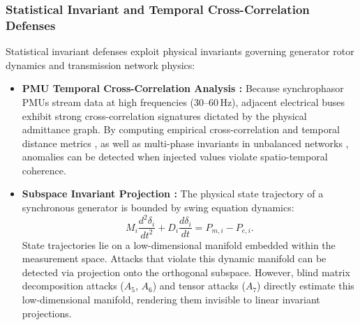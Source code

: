 \documentclass[journal,compsoc]{IEEEtran}
\begin{document}
\subsubsection{Statistical Invariant and Temporal Cross-Correlation Defenses}
Statistical invariant defenses exploit physical invariants governing generator rotor dynamics and transmission network physics:
\begin{itemize}
    \item \textbf{PMU Temporal Cross-Correlation Analysis \cite{ref61}:} Because synchrophasor PMUs stream data at high frequencies (30--60\,Hz), adjacent electrical buses exhibit strong cross-correlation signatures dictated by the physical admittance graph. By computing empirical cross-correlation and temporal distance metrics \cite{ref61, ref65}, as well as multi-phase invariants in unbalanced networks \cite{ref69}, anomalies can be detected when injected values violate spatio-temporal coherence.
    \item \textbf{Subspace Invariant Projection \cite{ref21, ref22, ref42, ref43}:} The physical state trajectory of a synchronous generator is bounded by swing equation dynamics:
    \begin{equation}
        M_i \frac{d^2 \delta_i}{dt^2} + D_i \frac{d\delta_i}{dt} = P_{m,i} - P_{e,i}.
    \end{equation}
    State trajectories lie on a low-dimensional manifold embedded within the measurement space. Attacks that violate this dynamic manifold can be detected via projection onto the orthogonal subspace. However, blind matrix decomposition attacks ($A_5$, $A_6$) and tensor attacks ($A_7$) directly estimate this low-dimensional manifold, rendering them invisible to linear invariant projections.
\end{itemize}
\end{document}
